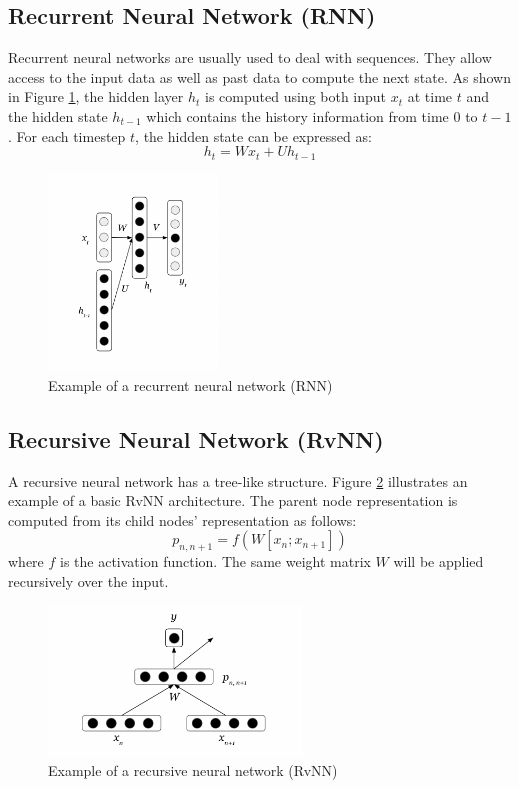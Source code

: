 \documentclass[12pt,a4paper,twoside,openright]{report}
\begin{document}
\subsection{Recurrent Neural Network (RNN)}
Recurrent neural networks are usually used to deal with sequences. They allow access to the input data as well as past data to compute the next state. As shown in Figure \ref{fig:rnn}, the hidden layer $h_t$ is computed using both input $x_t$ at time $t$ and the hidden state $h_{t-1}$ which contains the history information from time 0 to $t-1$. For each timestep $t$, the hidden state can be expressed as:
\[ h_t = Wx_t + Uh_{t-1} \]

\begin{figure}[ht]
\centering
\includegraphics[width=0.4\textwidth]{images/rnn.png}
\caption{Example of a recurrent neural network (RNN)}
\label{fig:rnn}
\end{figure}


\subsection{Recursive Neural Network (RvNN)}
A recursive neural network has a tree-like structure. Figure \ref{fig:rvnn} illustrates an example of a basic RvNN architecture. The parent node representation is computed from its child nodes' representation as follows:
\[ p_{n, n+1} = f(W[x_n; x_{n+1}]) \]
where $f$ is the activation function. The same weight matrix $W$ will be applied recursively over the input.

\begin{figure}[ht]
\centering
\includegraphics[width=0.6\textwidth]{images/rvnn.png}
\caption{Example of a recursive neural network (RvNN)}
\label{fig:rvnn}
\end{figure}
\end{document}
